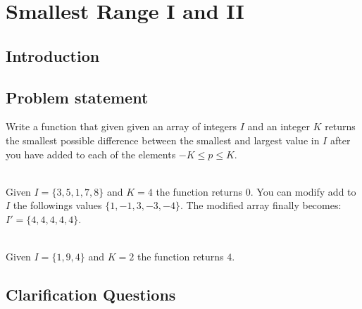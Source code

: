 %



\chapter{Smallest Range \RN{1} and \RN{2}}
\label{ch:smallest_range}
\section*{Introduction}

\section{Problem statement}
\begin{exercise}
\label{example:smallest_range:exercice1}
Write a function that given given an array of integers $I$ and an integer $K$ 
returns the smallest possible difference between the smallest and largest value in $I$
after you have added to each of the elements $-K \leq p \leq K$.

	\begin{example}
		\label{example:smallest_range:example1}
		\hfill \\
		Given $I = \{3,5,1,7,8\}$ and $K=4$ the function returns $0$. You can modify add to $I$ the followings values
		$\{1,-1,3,-3,-4\}$. The modified array finally becomes: $I'=\{4,4,4,4,4\}$. 
		
	\end{example}

	\begin{example}
		\label{example:smallest_range:example2}
		\hfill \\
		Given $I = \{1,9,4\}$ and $K=2$ the function returns $4$.
	\end{example}

\end{exercise}

\section{Clarification Questions}

